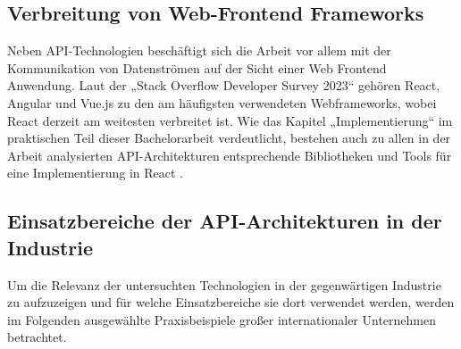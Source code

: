 \subsection{Verbreitung von Web-Frontend Frameworks}
Neben API-Technologien beschäftigt sich die Arbeit vor allem mit der Kommunikation von Datenströmen auf der Sicht einer Web Frontend Anwendung. Laut der „Stack Overflow Developer Survey 2023“ gehören React, Angular und Vue.js  zu den am häufigsten verwendeten Webframeworks, wobei React derzeit am weitesten verbreitet ist. Wie das Kapitel „Implementierung“ im praktischen Teil dieser Bachelorarbeit verdeutlicht, bestehen auch zu allen in der Arbeit analysierten API-Architekturen entsprechende Bibliotheken und Tools für eine Implementierung in React \parencite{stackoverflow2023}.

\subsection{Einsatzbereiche der API-Architekturen in der Industrie}
Um die Relevanz der untersuchten Technologien in der gegenwärtigen Industrie zu aufzuzeigen und für welche Einsatzbereiche sie dort verwendet werden, werden im Folgenden ausgewählte Praxisbeispiele großer internationaler Unternehmen betrachtet. 

